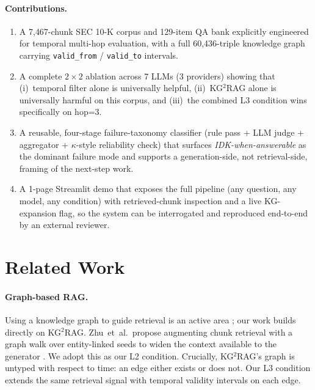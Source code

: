 \documentclass[11pt]{article}
\begin{document}
\paragraph{Contributions.}
\begin{enumerate}
\itemsep 0pt \parskip 0pt
  \item A 7{,}467-chunk SEC 10-K corpus and 129-item QA bank
    explicitly engineered for temporal multi-hop evaluation, with a
    full 60{,}436-triple knowledge graph carrying \texttt{valid\_from}
    / \texttt{valid\_to} intervals.
  \item A complete $2\times2$ ablation across 7 LLMs (3 providers)
    showing that (i)~temporal filter alone is universally helpful,
    (ii)~KG$^{2}$RAG alone is universally harmful on this corpus, and
    (iii)~the combined L3 condition wins specifically on hop=3.
  \item A reusable, four-stage failure-taxonomy classifier
    (rule pass + LLM judge + aggregator + $\kappa$-style reliability
    check) that surfaces \emph{IDK-when-answerable} as the dominant
    failure mode and supports a generation-side, not retrieval-side,
    framing of the next-step work.
  \item A 1-page Streamlit demo that exposes the full pipeline (any
    question, any model, any condition) with retrieved-chunk
    inspection and a live KG-expansion flag, so the system can be
    interrogated and reproduced end-to-end by an external reviewer.
\end{enumerate}

\section{Related Work}
\label{sec:related}

\paragraph{Graph-based RAG.}
Using a knowledge graph to guide retrieval is an active area
\citep{edge2024graphrag}; our work builds directly on KG$^{2}$RAG.
Zhu~et~al.\ propose augmenting chunk retrieval with a graph walk over
entity-linked seeds to widen the context available to the generator
\citep{zhu2025kg2rag}. We adopt this as our L2 condition. Crucially,
KG$^{2}$RAG's graph is untyped with respect to time: an edge either
exists or does not. Our L3 condition extends the same retrieval signal
with temporal validity intervals on each edge.
\end{document}
